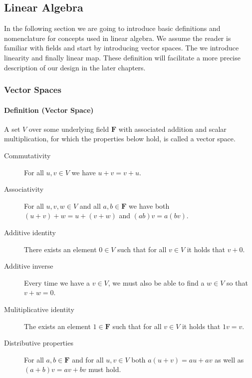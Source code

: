 \subsection{Linear Algebra}

In the following section we are going to introduce basic definitions and
nomenclature for concepts used in linear algebra.  We assume the reader is
familiar with fields and start by introducing vector spaces.  The we introduce
linearity and finally linear map.  These definition will facilitate a more
precise description of our design in the later chapters.

\subsubsection{Vector Spaces}

\paragraph{Definition (Vector Space)}\label{vectorspace}

A set \(V\) over some underlying field \(\pmb{F}\) with associated addition
and scalar multiplication, for which the properties below hold, is called a
vector space.\cite[Def. 1.19, p. 12]{ladr}


\begin{description}

  \item [Commutativity]
    For all \(u,v \in V\) we have \(u+v = v+u \).

  \item [Associativity]
    For all \(u,v,w \in V\) and all \(a,b \in \pmb{F}\) we have both \((u+v)+w = u + (v+w)\)
    and \( (ab)v = a(bv)\).

  \item [Additive identity]
    There exists an element \({0} \in V\) such that for all \(v \in V \) it holds
    that \(v + {0} \).

  \item [Additive inverse]
    Every time we have a \(v \in V\), we must also be able to find a \(w \in V\)
    so that \(v + w = 0 \).

  \item [Mulitiplicative identity]
    The exists an element \({1} \in \pmb{F}\) such that for all \(v \in V\) it
    holds that \({1}v = v\).

  \item [Distributive properties]
    For all \(a,b \in \pmb{F} \) and for all \(u,v \in V\) both
    \(a(u + v) = au + av \) as well as \((a+b)v = av + bv \) must hold.


\end{description}


